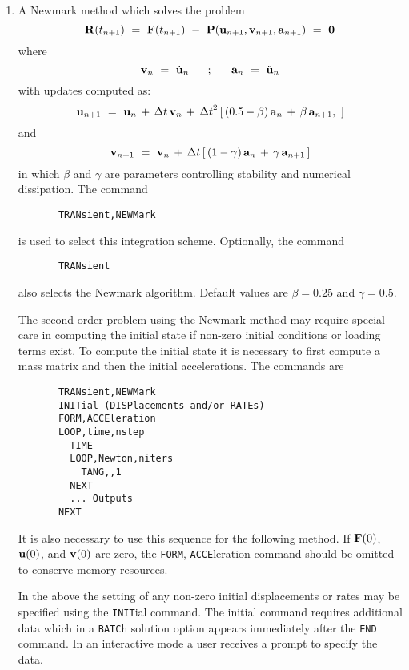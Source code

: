 \begin{enumerate}
\item
{A Newmark method \cite{newmark} which solves the problem
\begin{equation}
\mathbf{R} (t_{n+1}) ~=~ \mathbf{F}(t_{n+1})
~-~ \mathbf{P}( \mathbf{u}_{n+1} , \mathbf{v}_{n+1} , \mathbf{a}_{n+1}) ~=~ {\bf 0}
\end{equation}
where
\begin{equation}
\mathbf{v}_n ~=~ \dot{\mathbf{u}}_n ~~~~~;~~~~~ \mathbf{a}_n ~=~ \ddot{\mathbf{u}}_n
\end{equation}
with updates computed as:
\begin{equation}
\mathbf{u}_{n+1} ~=~ \mathbf{u}_n \,+\, {\Delta t} \, \mathbf{v}_n \,+\,
{\Delta t}^2 \, [ \, (0.5 - \beta ) \, \mathbf{a}_n
\,+\, \beta \, \mathbf{a}_{n+1} ,\ ]
\end{equation}
and
\begin{equation}
\mathbf{v}_{n+1} ~=~ \mathbf{v}_n \,+\, {\Delta t} \,[\, (1 - \gamma) \, \mathbf{a}_n
\,+\, \gamma \, \mathbf{a}_{n+1} \, ]
\end{equation}
in which $\beta$ and $\gamma$ are parameters controlling stability and
numerical dissipation.  The command
\begin{verbatim}
       TRANsient,NEWMark
\end{verbatim}
is used to select this integration scheme.  Optionally, the command
\begin{verbatim}
       TRANsient
\end{verbatim}
also selects the Newmark algorithm.
Default values are $\beta = 0.25$ and $\gamma = 0.5$.

The second order problem using the Newmark method may require special
care in computing the initial state if non-zero initial conditions
or loading terms exist.  To compute the initial state it is necessary to
first compute a mass matrix and then the initial accelerations.  The
commands are
\begin{verbatim}
       TRANsient,NEWMark
       INITial (DISPlacements and/or RATEs)
       FORM,ACCEleration
       LOOP,time,nstep
         TIME
         LOOP,Newton,niters
           TANG,,1
         NEXT
         ... Outputs
       NEXT
\end{verbatim}
It is also necessary to use this sequence for the following method.
If $\mathbf{F} (0)$, $\mathbf{u} (0)$, and $\mathbf{v} (0)$ are zero, the
{\tt FORM}, {\tt ACCE}leration command should be omitted to conserve
memory resources.}

In the above the setting of any non-zero initial displacements or rates
may be specified using the {\tt INIT}ial command.  The initial command
requires additional data which in a {\tt BATC}h solution option appears
immediately after the {\tt END} command.  In an interactive mode a user
receives a prompt to specify the data.


\end{enumerate}
